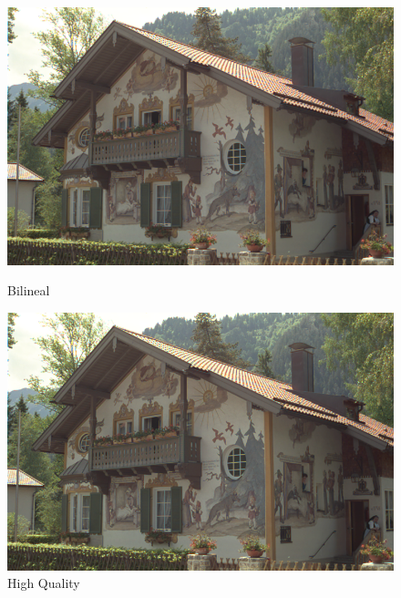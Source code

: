 {\begin{figure}[!htb]
\begin{center}
    \includegraphics[scale=0.3]{imagenes/img12_demosicing_bilineal.png}
    \caption{Bilineal }
 \end{center}
\endminipage
{}
\begin{center}
    \includegraphics[scale=0.3]{imagenes/img12_demosicing_quality.png}
    \caption{High Quality}
        \end{center}
\endminipage\hfill
\end{figure}

}
